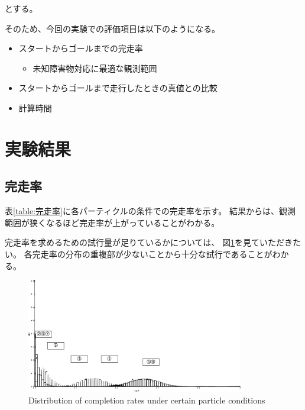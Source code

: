 \documentclass{jarticle}
\begin{document}
とする。

そのため、今回の実験での評価項目は以下のようになる。

\begin{itemize}
  \item スタートからゴールまでの完走率
  \begin{itemize}
    \item 未知障害物対応に最適な観測範囲
  \end{itemize}
  \item スタートからゴールまで走行したときの真値との比較
  \item 計算時間
\end{itemize}

\section{実験結果}%

\subsection{完走率}
表\ref{table:完走率}に各パーティクルの条件での完走率を示す。
結果からは、観測範囲が狭くなるほど完走率が上がっていることがわかる。


完走率を求めるための試行量が足りているかについては、
図\ref{fig: 完走率の分布}を見ていただきたい。
各完走率の分布の重複部が少ないことから十分な試行であることがわかる。

\begin{figure}[htbp]
  \centering
   \includegraphics[height=50mm]{fig/kansouritsu.eps}
   \vspace*{-4mm}
   \caption{Distribution of completion rates under certain particle conditions}
   \label{fig: 完走率の分布}
\end{figure}
\end{document}
